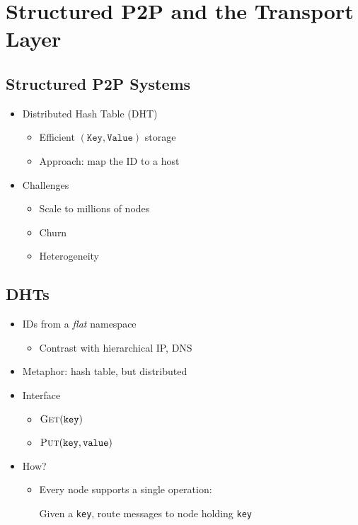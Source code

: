 \section{Structured P2P and the Transport Layer}
\subsection{Structured P2P Systems}
\begin{itemize}[nosep]
    \item Distributed Hash Table (DHT)
          \begin{itemize}[nosep]
              \item Efficient $(\texttt{Key}, \texttt{Value})$ storage
              \item Approach: map the ID to a host
          \end{itemize}
    \item Challenges
          \begin{itemize}[nosep]
              \item Scale to millions of nodes
              \item Churn
              \item Heterogeneity
          \end{itemize}
\end{itemize}
\subsection{DHTs}
\begin{itemize}[nosep]
    \item IDs from a \emph{flat} namespace
          \begin{itemize}[nosep]
              \item Contrast with hierarchical IP, DNS
          \end{itemize}
    \item Metaphor: hash table, but distributed
    \item Interface
          \begin{itemize}[nosep]
              \item $\textproc{Get}(\texttt{key})$
              \item $\textproc{Put}(\texttt{key}, \texttt{value})$
          \end{itemize}
    \item How?
          \begin{itemize}[nosep]
              \item Every node supports a single operation:

                    Given a \texttt{key}, route messages to node holding \texttt{key}
          \end{itemize}
\end{itemize}
